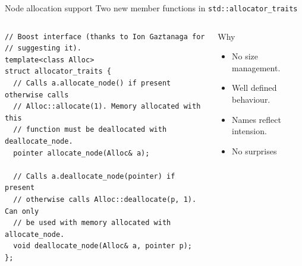 \documentclass[10pt,aspectratio=169]{beamer}
\begin{document}
\begin{frame}[fragile]
{Node allocation support}
{Two new member functions in \texttt{std::allocator\_traits}}

\begin{columns}
\begin{column}{0.60\textwidth}
\begin{lstlisting}
// Boost interface (thanks to Ion Gaztanaga for
// suggesting it).
template<class Alloc>
struct allocator_traits {
  // Calls a.allocate_node() if present otherwise calls
  // Alloc::allocate(1). Memory allocated with this
  // function must be deallocated with deallocate_node.
  pointer allocate_node(Alloc& a);

  // Calls a.deallocate_node(pointer) if present
  // otherwise calls Alloc::deallocate(p, 1). Can only
  // be used with memory allocated with allocate_node.
  void deallocate_node(Alloc& a, pointer p);
};
\end{lstlisting}
\end{column}

\begin{column}{0.40\textwidth}
\begin{block}{Why}
\begin{itemize}
\item No size management.
\item Well defined behaviour.
\item Names reflect intension.
\item {\color{alertc}No surprises}
\end{itemize}
\end{block}
\end{column}

\end{columns}

\end{frame}
\end{document}
